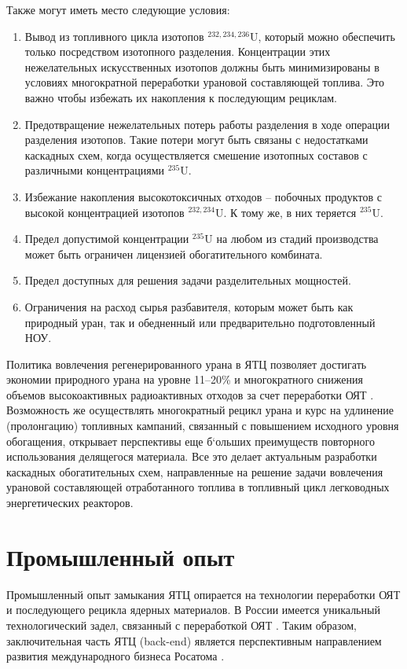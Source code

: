 Также могут иметь место следующие условия:
\begin{enumerate}
  \item Вывод из топливного цикла изотопов $^{232,234,236}$U, который можно обеспечить только посредством изотопного разделения. Концентрации этих нежелательных искусственных изотопов должны быть минимизированы в условиях многократной переработки урановой составляющей топлива. Это важно чтобы избежать их накопления к последующим рециклам.
  \item Предотвращение нежелательных потерь работы разделения в ходе операции разделения изотопов. Такие потери могут быть связаны с недостатками каскадных схем, когда осуществляется смешение изотопных составов с различными концентрациями $^{235}$U. 
  \item Избежание накопления высокотоксичных отходов -- побочных продуктов с высокой концентрацией изотопов $^{232,234}$U. К тому же, в них теряется $^{235}$U.
  \item Предел допустимой концентрации $^{235}$U на любом из стадий производства может быть ограничен лицензией обогатительного комбината.
  \item Предел доступных для решения задачи разделительных мощностей.
  \item Ограничения на расход сырья разбавителя, которым может быть как природный уран, так и обедненный или предварительно подготовленный НОУ.
\end{enumerate}

Политика вовлечения регенерированного урана в ЯТЦ позволяет достигать экономии природного урана на уровне 11--20\% и многократного снижения объемов высокоактивных радиоактивных отходов за счет переработки ОЯТ \cite{delculAnalysisReuseUranium2009}. Возможность же осуществлять многократный рецикл урана и курс на удлинение (пролонгацию) топливных кампаний, связанный с повышением исходного уровня обогащения, открывает перспективы еще б`ольших преимуществ повторного использования делящегося материала.
Все это делает актуальным разработки каскадных обогатительных схем, направленные на решение задачи вовлечения урановой составляющей отработанного топлива в топливный цикл легководных энергетических реакторов.


\section{Промышленный опыт}\label{sec:ch1/sec1}
Промышленный опыт замыкания ЯТЦ опирается на технологии переработки ОЯТ и последующего рецикла ядерных материалов.
В России имеется уникальный технологический задел, связанный с переработкой ОЯТ \cite{balihinSostoyaniiPerspektivahRazvitiya2018}.
Таким образом, заключительная часть ЯТЦ (back-end) является перспективным направлением развития международного бизнеса Росатома \cite{efimenkoProblemyPerspektivyRazvitiya2017}. 

